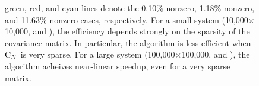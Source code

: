 \begin{figure}[t]
\begin{center}
{{        green, red, and cyan lines denote the 0.10\% nonzero, 1.18\% nonzero, and 11.63\%
        nonzero cases, respectively.  For a small system (10,000$\times$10,000,
         and ), the efficiency depends
        strongly on the sparsity of the covariance matrix.  In particular, the algorithm
        is less efficient when $\mathrm{C}_N$ is very sparse.  For a large system
        (100,000$\times$100,000,  and ), the
        algorithm acheives near-linear speedup, even for a very sparse matrix.}}
    \label{fig:grad}
  \end{center}
\end{figure}

